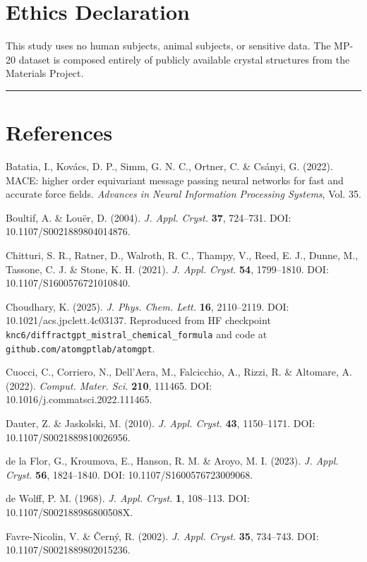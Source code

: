 \documentclass[
  11pt,
]{article}
\begin{document}
\section{Ethics Declaration}\label{ethics-declaration}

This study uses no human subjects, animal subjects, or sensitive data.
The MP-20 dataset is composed entirely of publicly available crystal
structures from the Materials Project.

\begin{center}\rule{0.5\linewidth}{0.5pt}\end{center}

\section{References}\label{references}

Batatia, I., Kovács, D. P., Simm, G. N. C., Ortner, C. \& Csányi, G.
(2022). MACE: higher order equivariant message passing neural networks
for fast and accurate force fields. \emph{Advances in Neural Information
Processing Systems}, Vol. 35.

Boultif, A. \& Louër, D. (2004). \emph{J. Appl. Cryst.} \textbf{37},
724--731. DOI: 10.1107/S0021889804014876.

Chitturi, S. R., Ratner, D., Walroth, R. C., Thampy, V., Reed, E. J.,
Dunne, M., Tassone, C. J. \& Stone, K. H. (2021). \emph{J. Appl. Cryst.}
\textbf{54}, 1799--1810. DOI: 10.1107/S1600576721010840.

Choudhary, K. (2025). \emph{J. Phys. Chem. Lett.} \textbf{16},
2110--2119. DOI: 10.1021/acs.jpclett.4c03137. Reproduced from HF
checkpoint \texttt{knc6/diffractgpt\_mistral\_chemical\_formula} and
code at \texttt{github.com/atomgptlab/atomgpt}.

Cuocci, C., Corriero, N., Dell'Aera, M., Falcicchio, A., Rizzi, R. \&
Altomare, A. (2022). \emph{Comput. Mater. Sci.} \textbf{210}, 111465.
DOI: 10.1016/j.commatsci.2022.111465.

Dauter, Z. \& Jaskolski, M. (2010). \emph{J. Appl. Cryst.} \textbf{43},
1150--1171. DOI: 10.1107/S0021889810026956.

de la Flor, G., Kroumova, E., Hanson, R. M. \& Aroyo, M. I. (2023).
\emph{J. Appl. Cryst.} \textbf{56}, 1824--1840. DOI:
10.1107/S1600576723009068.

de Wolff, P. M. (1968). \emph{J. Appl. Cryst.} \textbf{1}, 108--113.
DOI: 10.1107/S002188986800508X.

Favre-Nicolin, V. \& Černý, R. (2002). \emph{J. Appl. Cryst.}
\textbf{35}, 734--743. DOI: 10.1107/S0021889802015236.
\end{document}
